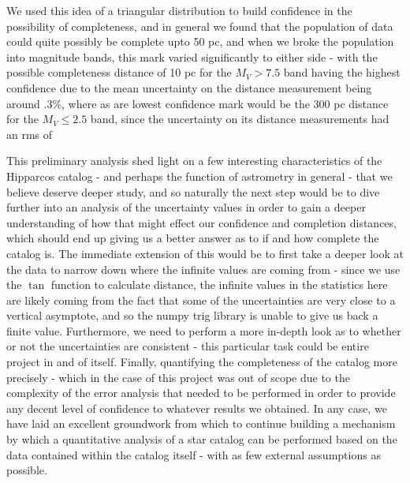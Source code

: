 \documentclass{business-covered} %
\begin{document}
		We used this idea of a triangular distribution to build confidence in the possibility of completeness, and in general we found that the population of data could quite possibly be complete upto 50 pc, and when we broke the population into magnitude bands, this mark varied significantly to either side - with the possible completeness distance of 10 pc for the $M_V>7.5$ band having the highest confidence due to the mean uncertainty on the distance measurement being around .3\%, where as are lowest confidence mark would be the 300 pc distance for the $M_V\le 2.5$ band, since the uncertainty on its distance measurements had an rms of
		
		This preliminary analysis shed light on a few interesting characteristics of the Hipparcos catalog - and perhaps the function of astrometry in general - that we believe deserve deeper study, and so naturally the next step would be to dive further into an analysis of the uncertainty values in order to gain a deeper understanding of how that might effect our confidence and completion distances, which should end up giving us a better answer as to if and how complete the catalog is. 
		The immediate extension of this would be to first take a deeper look at the data to narrow down where the infinite values are coming from - since we use the $\tan$ function to calculate distance, the infinite values in the statistics here are likely coming from the fact that some of the uncertainties are very close to a vertical asymptote, and so the numpy trig library is unable to give us back a finite value. Furthermore, we need to perform a more in-depth look as to whether or not the uncertainties are consistent - this particular task could be entire project in and of itself. Finally, quantifying the completeness of the catalog more precisely - which in the case of this project was out of scope due to the complexity of the error analysis that needed to be performed in order to provide any decent level of confidence to whatever results we obtained. 
		In any case, we have laid an excellent groundwork from which to continue building a mechanism by which a quantitative analysis of a star catalog can be performed based on the data contained within the catalog itself - with as few external assumptions as possible.

\pagebreak
\nocite{vizier}
\nocite{nasa}
\nocite{cosmos}
\nocite{brit}


\end{document}
